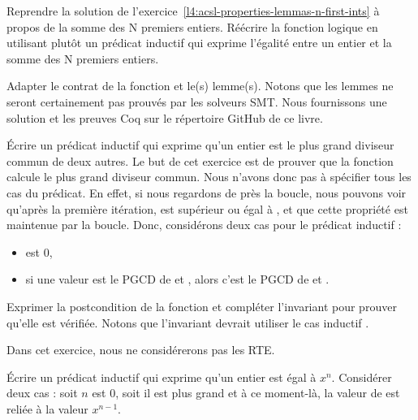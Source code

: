 Reprendre la solution de l'exercice~\ref{l4:acsl-properties-lemmas-n-first-ints} à
propos de la somme des N premiers entiers. Réécrire la fonction logique en utilisant
plutôt un prédicat inductif qui exprime l'égalité entre un entier et la somme des
N premiers entiers.





Adapter le contrat de la fonction et le(s) lemme(s). Notons que les lemmes ne
seront certainement pas prouvés par les solveurs SMT. Nous fournissons une solution
et les preuves Coq sur le répertoire GitHub de ce livre.





Écrire un prédicat inductif qui exprime qu'un entier est le plus grand diviseur
commun de deux autres. Le but de cet exercice est de prouver que la fonction
 calcule le plus grand diviseur commun. Nous n'avons donc pas
à spécifier tous les cas du prédicat. En effet, si nous regardons de près la boucle,
nous pouvons voir qu'après la première itération,  est supérieur ou
égal à , et que cette propriété est maintenue par la boucle. Donc,
considérons deux cas pour le prédicat inductif :
\begin{itemize}
\item {} est 0,
\item si une valeur  est le PGCD de  et ,
      alors c'est le PGCD de  et .
\end{itemize}




Exprimer la postcondition de la fonction et compléter l'invariant pour prouver
qu'elle est vérifiée. Notons que l'invariant devrait utiliser le cas inductif
.





Dans cet exercice, nous ne considérerons pas les RTE.


Écrire un prédicat inductif qui exprime qu'un entier  est égal
à $x^n$. Considérer deux cas : soit $n$ est 0, soit il est plus grand et à ce
moment-là, la valeur de  est reliée à la valeur $x^{n-1}$.




